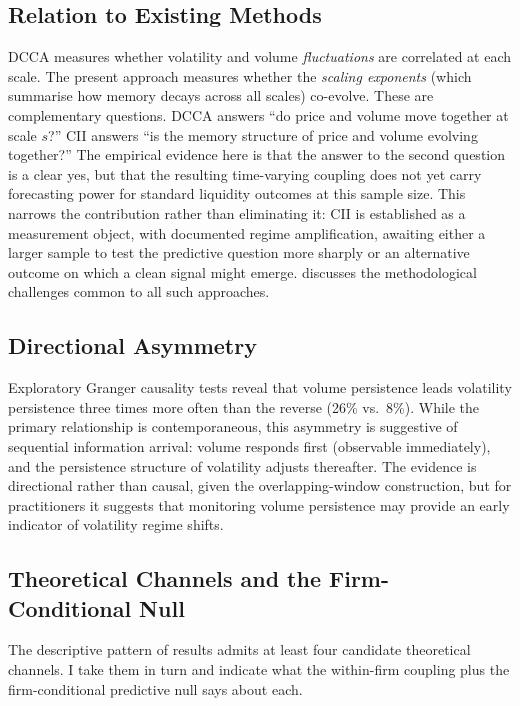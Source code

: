 \documentclass[preprint,12pt,authoryear]{elsarticle}
\begin{document}
\subsection{Relation to Existing Methods}

DCCA \citep{podobnik2008detrended} measures whether volatility and volume \emph{fluctuations} are correlated at each scale. The present approach measures whether the \emph{scaling exponents} (which summarise how memory decays across all scales) co-evolve. These are complementary questions. DCCA answers ``do price and volume move together at scale $s$?'' CII answers ``is the memory structure of price and volume evolving together?'' The empirical evidence here is that the answer to the second question is a clear yes, but that the resulting time-varying coupling does not yet carry forecasting power for standard liquidity outcomes at this sample size. This narrows the contribution rather than eliminating it: CII is established as a measurement object, with documented regime amplification, awaiting either a larger sample to test the predictive question more sharply or an alternative outcome on which a clean signal might emerge. \citet{kristoufek2015power} discusses the methodological challenges common to all such approaches.

\subsection{Directional Asymmetry}

Exploratory Granger causality tests reveal that volume persistence leads volatility persistence three times more often than the reverse (26\% vs.\ 8\%). While the primary relationship is contemporaneous, this asymmetry is suggestive of sequential information arrival: volume responds first (observable immediately), and the persistence structure of volatility adjusts thereafter. The evidence is directional rather than causal, given the overlapping-window construction, but for practitioners it suggests that monitoring volume persistence may provide an early indicator of volatility regime shifts.

\subsection{Theoretical Channels and the Firm-Conditional Null}
\label{sec:mechanism}

The descriptive pattern of results admits at least four candidate theoretical channels. I take them in turn and indicate what the within-firm coupling plus the firm-conditional predictive null says about each.
\end{document}

